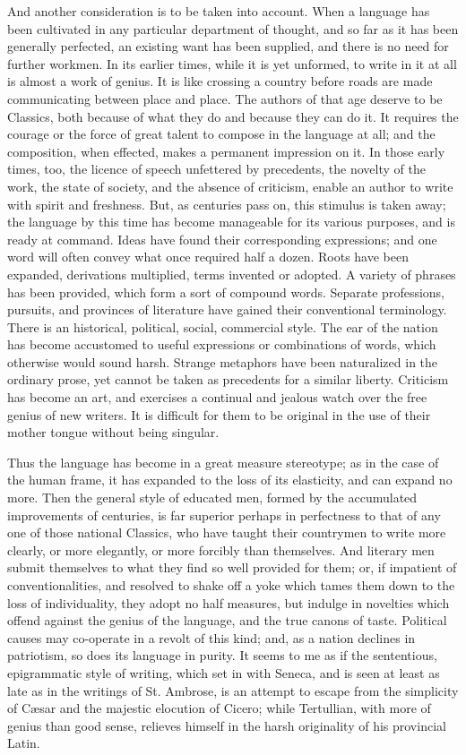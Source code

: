 And another consideration is to be taken into account. When a
language has been cultivated in any particular department of thought,
and so far as it has been generally perfected, an existing want has
been supplied, and there is no need for further workmen. In its
earlier times, while it is yet unformed, to write in it at all is
almost a work of genius. It is like crossing a country before roads
are made communicating between place and place. The authors of that
age deserve to be Classics, both because of what they do and because
they can do it. It requires the courage or the force of great talent
to compose in the language at all; and the composition, when effected,
makes a permanent impression on it. In those early times, too, the
licence of speech unfettered by precedents, the novelty of the work,
the state of society, and the absence of criticism, enable an author
to write with spirit and freshness. But, as centuries pass on, this
stimulus is taken away; the language by this time has become
manageable for its various purposes, and is ready at command. Ideas
have found their corresponding expressions; and one word will often
convey what once required half a dozen. Roots have been expanded,
derivations multiplied, terms invented or adopted. A variety of
phrases has been provided, which form a sort of compound words.
Separate professions, pursuits, and provinces of literature have
gained their conventional terminology. There is an historical,
political, social, commercial style. The ear of the nation has become
accustomed to useful expressions or combinations of words, which
otherwise would sound harsh. Strange metaphors have been naturalized
in the ordinary prose, yet cannot be taken as precedents for a similar
liberty. Criticism has become an art, and exercises a continual and
jealous watch over the free genius of new writers. It is difficult for
them to be original in the use of their mother tongue without being
singular.

Thus the language has become in a great measure stereotype; as in
the case of the human frame, it has expanded to the loss of its
elasticity, and can expand no more. Then the general style of educated
men, formed by the accumulated improvements of centuries, is far
superior perhaps in perfectness to that of any one of those national
Classics, who have taught their countrymen to write more clearly, or
more elegantly, or more forcibly than themselves. And literary men
submit themselves to what they find so well provided for them; or, if
impatient of conventionalities, and resolved to shake off a yoke which
tames them down to the loss of individuality, they adopt no half
measures, but indulge in novelties which offend against the genius of
the language, and the true canons of taste. Political causes may
co-operate in a revolt of this kind; and, as a nation declines in
patriotism, so does its language in purity. It seems to me as if the
sententious, epigrammatic style of writing, which set in with Seneca,
and is seen at least as late as in the writings of St. Ambrose, is an
attempt to escape from the simplicity of Cæsar and the majestic
elocution of Cicero; while Tertullian, with more of genius than good
sense, relieves himself in the harsh originality of his provincial
Latin.

